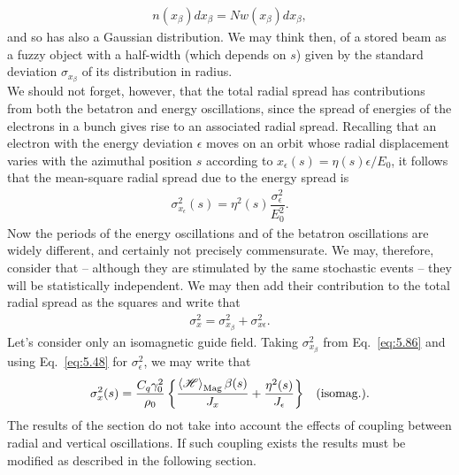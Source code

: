 \documentclass[../sands-adaptation.tex]{subfiles}
\begin{document}
\begin{align*}
	n(x_\beta)dx_\beta = Nw(x_\beta)dx_\beta,
\end{align*}
and so has also a Gaussian distribution. We may think then, of a stored beam as a fuzzy object with a half-width (which depends on $s$) given by the standard deviation $\sigma_{x_\beta}$ of its distribution in radius.\\
We should not forget, however, that the total radial spread has contributions from both the betatron and energy oscillations, since the spread of energies of the electrons in a bunch gives rise to an associated radial spread. Recalling that an electron with the energy deviation $\epsilon$ moves on an orbit whose radial displacement varies with the azimuthal position $s$ according to $x_\epsilon(s) = \eta(s) \epsilon/E_0$, it follows that the mean-square radial spread due to the energy spread is
\begin{align}
	\sigma_{x_\epsilon}^2(s) = \eta^2(s) \dfrac{\sigma_\epsilon^2}{E_0^2}.
\end{align}
Now the periods of the energy oscillations and of the betatron oscillations are widely different, and certainly not precisely commensurate. We may, therefore, consider that -- although they are stimulated by the same stochastic events -- they will be statistically independent. We may then add their contribution to the total
radial spread as the squares and write that
\begin{align}
	\sigma_x^2 = \sigma_{x_\beta}^2 + \sigma_{x\epsilon}^2.
\end{align}
Let's consider only an isomagnetic guide field. Taking $\sigma_{x_\beta}^2$ from Eq.~\eqref{eq:5.86} and using Eq.~\eqref{eq:5.48} for $\sigma_\epsilon^2$, we may write that
\begin{align}
	\sigma_x^2(s) = \dfrac{C_q\gamma_0^2}{\rho_0} \left\lbrace \dfrac{\left< \mathscr{H} \right>_\text{Mag} \beta(s)}{J_x} + \dfrac{\eta^2(s)}{J_\epsilon} \right\rbrace && \text{(isomag.)}.
\end{align}
The results of the section do not take into account the effects of coupling between radial and vertical oscillations. If such coupling exists the results must be modified as described in the following section.
\end{document}
